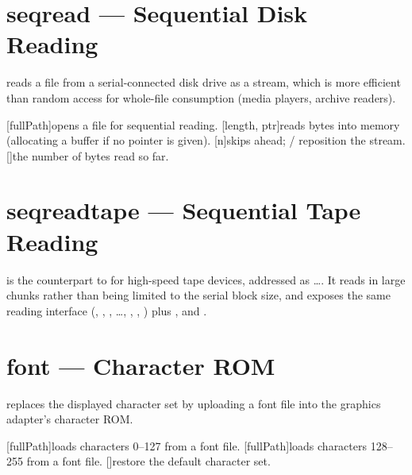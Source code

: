 \section{seqread --- Sequential Disk Reading}

 reads a file from a serial-connected disk drive as a stream, which is more efficient than random access for whole-file consumption (media players, archive readers).

\begin{outline}
\1[fullPath]{opens a file for sequential reading.}
\1[length, ptr]{reads bytes into memory (allocating a buffer if no pointer is given).}
\1
\1[n]{skips ahead; / reposition the stream.}
\1[]{the number of bytes read so far.}
\end{outline}

\section{seqreadtape --- Sequential Tape Reading}

 is the counterpart to  for high-speed tape devices, addressed as \dots{}. It reads in large chunks rather than being limited to the serial block size, and exposes the same reading interface (, , , \dots, , , ) plus ,  and .

\section{font --- Character ROM}

 replaces the displayed character set by uploading a font file into the graphics adapter's character ROM.

\begin{outline}
\1[fullPath]{loads characters 0--127 from a font file.}
\1[fullPath]{loads characters 128--255 from a font file.}
\1[]{restore the default character set.}
\end{outline}


